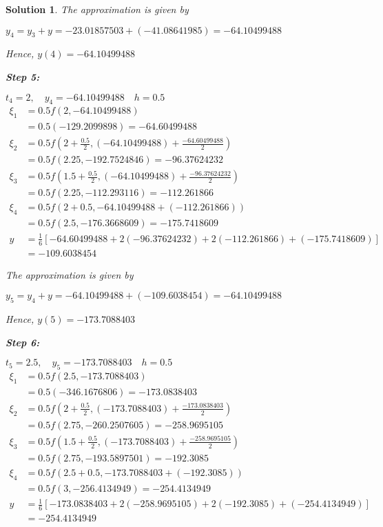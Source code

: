 \documentclass[12pt,a4paper]{article}
\newtheorem{solution}[theorem]{Solution}
\begin{document}
\begin{solution}
The approximation is given by 

$ y_4 = y_3 + y = -23.01857503 + (-41.08641985) = -64.10499488$

Hence, \quad $y(4) = -64.10499488$

\textbf{Step 5:}

$t_4 = 2, \quad y_4= -64.10499488 \quad h=0.5 $
\begin{align*}
\xi_1 &= 0.5f(2,-64.10499488) \\
&= 0.5(-129.2099898) = -64.60499488 \\
\xi_2 &= 0.5f\left( 2 + \frac{0.5}{2}, (-64.10499488) + \frac{-64.60499488}{2} \right)  \\
&= 0.5f(2.25, -192.7524846) = -96.37624232 \\
\xi_3 &= 0.5f\left( 1.5 + \frac{0.5}{2}, (-64.10499488) + \frac{-96.37624232}{2}\right)  \\
&= 0.5f(2.25, -112.293116) = -112.261866 \\
\xi_4 &= 0.5f(2 + 0.5, -64.10499488 +(-112.261866)) \\
&= 0.5f(2.5, -176.3668609) = -175.7418609 \\
y &= \frac{1}{6} \left[ -64.60499488 + 2(-96.37624232) + 2(-112.261866) + (-175.7418609) \right] \\
&= -109.6038454
\end{align*}

The approximation is given by 

$ y_5 = y_4 + y = -64.10499488 + (-109.6038454) = -64.10499488$

Hence, \quad $y(5) = -173.7088403$

\textbf{Step 6:}

$t_5 = 2.5, \quad y_5 = -173.7088403 \quad h=0.5 $
\begin{align*}
\xi_1 &= 0.5f(2.5,-173.7088403) \\
&= 0.5(-346.1676806) = -173.0838403 \\
\xi_2 &= 0.5f\left( 2 + \frac{0.5}{2}, (-173.7088403) + \frac{-173.0838403}{2} \right)  \\
&= 0.5f(2.75, -260.2507605) = -258.9695105 \\
\xi_3 &= 0.5f\left( 1.5 + \frac{0.5}{2}, (-173.7088403) + \frac{-258.9695105 }{2}\right)  \\
&= 0.5f(2.75,-193.5897501) = -192.3085 \\
\xi_4 &= 0.5f(2.5 + 0.5, -173.7088403 +(-192.3085)) \\
&= 0.5f(3, -256.4134949) = -254.4134949 \\
y &= \frac{1}{6} \left[ -173.0838403 + 2(-258.9695105) + 2(-192.3085) + (-254.4134949) \right] \\
&= -254.4134949
\end{align*}


\end{solution}
\end{document}
